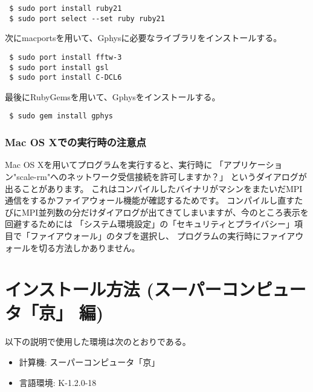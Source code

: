 \begin{verbatim}
 $ sudo port install ruby21
 $ sudo port select --set ruby ruby21
\end{verbatim}

次にmacportsを用いて、Gphysに必要なライブラリをインストールする。

\begin{verbatim}
 $ sudo port install fftw-3
 $ sudo port install gsl
 $ sudo port install C-DCL6
\end{verbatim}

最後にRubyGemsを用いて、Gphysをインストールする。

\begin{verbatim}
 $ sudo gem install gphys
\end{verbatim}


\subsubsection{Mac OS Xでの実行時の注意点}

Mac OS Xを用いて\scalerm プログラムを実行すると、実行時に
「アプリケーション"scale-rm"へのネットワーク受信接続を許可しますか？」
というダイアログが出ることがあります。
これはコンパイルしたバイナリがマシンをまたいだMPI通信をするかファイアウォール機能が確認するためです。
コンパイルし直すたびにMPI並列数の分だけダイアログが出てきてしまいますが、今のところ表示を回避するためには
「システム環境設定」の「セキュリティとプライバシー」項目で「ファイアウォール」のタブを選択し、
プログラムの実行時にファイアウォールを切る方法しかありません。



\section{インストール方法 (スーパーコンピュータ「京」 編)} \label{chap:install_supercom}

以下の説明で使用した環境は次のとおりである。
\begin{itemize}
\item 計算機: スーパーコンピュータ「京」
\item 言語環境: K-1.2.0-18
\end{itemize}

